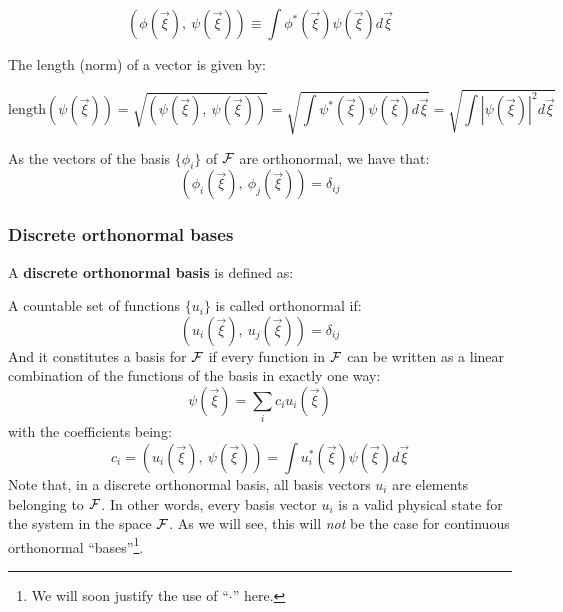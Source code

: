 \begin{equation}
    \left(\phi(\vec{\xi}), \ \psi(\vec{\xi})\right) \equiv \int\phi^*(\vec{\xi})\psi(\vec{\xi})d\vec{\xi}
\end{equation}

The length (norm) of a vector is given by:

\begin{equation}
    \text{length}\left(\psi(\vec{\xi})\right)=\sqrt{\left(\psi(\vec{\xi}), \ \psi(\vec{\xi})\right)} = \sqrt{\int\psi^*(\vec{\xi})\psi(\vec{\xi})d\vec{\xi}} = \sqrt{\int\left|\psi(\vec{\xi}) \right|^2d\vec{\xi}}
\end{equation}

As the vectors of the basis $\{\phi_i\}$ of $\mathcal{F}$ are orthonormal, we have that:
\begin{equation}
    \left(\phi_i(\vec{\xi}), \ \phi_j(\vec{\xi})\right) = \delta_{ij}
\end{equation}

\subsubsection{Discrete orthonormal bases}

A \textbf{discrete orthonormal basis} is defined as:

\begin{definition}
    A countable set of functions $\{u_i\}$ is called orthonormal if:
    \begin{equation}
        \left(u_i(\vec{\xi}), \ u_j(\vec{\xi})\right) = \delta_{ij}
    \end{equation}
    And it constitutes a basis for $\mathcal{F}$ if every function in $\mathcal{F}$ can be written as a linear combination of the functions of the basis in exactly one way:
    \begin{equation}
        \psi(\vec{\xi}) = \sum_i c_i u_i(\vec{\xi})
    \end{equation}
    with the coefficients being:
    \begin{equation}
        c_i = \left(u_i(\vec{\xi}), \ \psi(\vec{\xi})\right) = \int u_i^*(\vec{\xi})\psi(\vec{\xi})d\vec{\xi}
    \end{equation}    
    Note that, in a discrete orthonormal basis, all basis vectors $u_i$ are elements belonging to $\mathcal{F}$. In other words, every basis vector $u_i$ is a valid physical state for the system in the space $\mathcal{F}$. As we will see, this will \textit{not} be the case for continuous orthonormal ``bases''\footnote{We will soon justify the use of ``$\cdot$'' here.}.
\end{definition}

